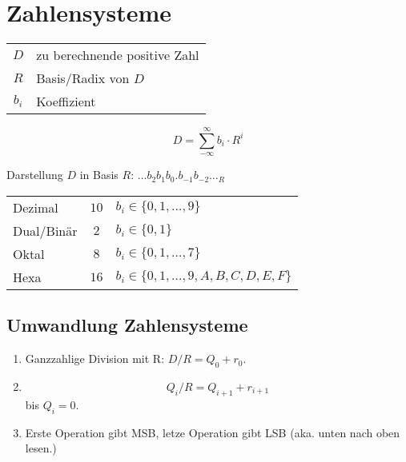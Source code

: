\section{Zahlensysteme}
\begin{center}
    \begin{minipage}{0.65\linewidth}
        \begin{center}
            \begin{tabular}{c l}
                $D$ & zu berechnende positive Zahl\\
                $R$ & Basis/Radix von $D$\\
                $b_i$ & Koeffizient
            \end{tabular}
        \end{center}
    \end{minipage}
    \hfill
    \begin{minipage}{0.3\linewidth}
        \begin{equation*}
            D = \sum_{-\infty}^{\infty} b_i \cdot R^i
        \end{equation*}
    \end{minipage}
\end{center}
Darstellung $D$ in Basis $R$: $\dots b_2 b_1 b_0 . b_{-1} b_{-2} \dots _{R}$
\begin{flushleft}
    \begin{tabular}{l c l}
        Dezimal & $10$ & $b_i \in \{0, 1, \dots, 9\}$\\
        Dual/Binär & $2$ & $b_i \in \{0, 1\}$\\
        Oktal & $8$ & $b_i \in \{0, 1, \dots, 7\}$\\
        Hexa & $16$ & $b_i \in \{0, 1, \dots, 9, A, B, C, D, E, F\}$\\
    \end{tabular}
\end{flushleft}

\subsection{Umwandlung Zahlensysteme}
\begin{enumerate}
    \item Ganzzahlige Division mit R: $D/R = Q_0 + r_0$.
    \item $$Q_i/R = Q_{i + 1} + r_{i + 1}$$ bis $Q_i = 0$.
    \item Erste Operation gibt MSB, letze Operation gibt LSB {\small (aka. unten nach oben lesen.)}
\end{enumerate}
